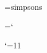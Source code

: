 % 
% 
% 
% 
% 
% 
% 
% 
 
\let\ifGoofy=\iffalse 
    \def\Goofy{\let\ifGoofy\iftrue} \def\unGoofy{\let\ifGoofy\iffalse} 
\let\ifLeft=\iffalse 
    \def\Left {\let\ifLeft \iftrue} \def\unLeft {\let\ifLeft \iffalse} 
 
\font\simpsons=simpsons \nopagenumbers 
 
=\catcode`\@       %
 
\catcode`\@=11 
 
% 
% 
% 
% 
% 
% 
% 
% 
 
